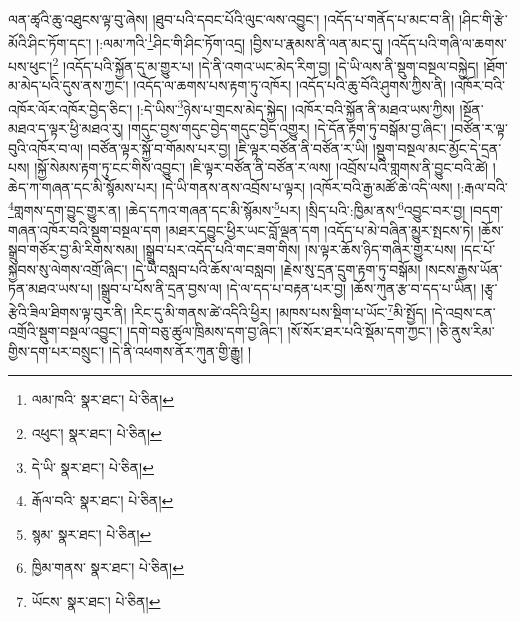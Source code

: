 ལན་ཚྭའི་ཆུ་འཐུངས་ལྟ་བུ་ཞེས། །ཐུབ་པའི་དབང་པོའི་ལུང་ལས་འབྱུང་། །འདོད་པ་གནོད་པ་མང་བ་ནི། །ཤིང་གི་རྩེ་མོའི་ཤིང་ཏོག་དང་། །:ལམ་ཀའི་\footnote{ལམ་ཁའི་  སྣར་ཐང་།  པེ་ཅིན། }ཤིང་གི་ཤིང་ཏོག་འདྲ། །བྱིས་པ་རྣམས་ནི་ལན་མང་དུ། །འདོད་པའི་གཞི་ལ་ཆགས་པས་ཕུང་།\footnote{འཕུང་།  སྣར་ཐང་།  པེ་ཅིན། } །འདོད་པའི་སྐྱོན་དུ་མ་གྱུར་པ། །དེ་ནི་འགའ་ཡང་མེད་རིག་བྱ། །དེ་ཡི་ལས་ནི་སྡུག་བསྔལ་བསྐྱེད། །ཐོག་མ་མེད་པའི་དུས་ནས་ཀྱང་། །འདོད་ལ་ཆགས་པས་རྟག་ཏུ་འཁོར། །འདོད་པའི་ཆུ་བོའི་ཤུགས་ཀྱིས་ནི། །འཁོར་བའི་འཁོར་ལོར་འཁོར་བྱེད་ཅིང་། །:དེ་ཡིས་\footnote{དེ་ཡི་  སྣར་ཐང་།  པེ་ཅིན། }ཉེས་པ་གྲངས་མེད་སྐྱེད། །འཁོར་བའི་སྐྱོན་ནི་མཐའ་ཡས་ཀྱིས། །སྔོན་མཐའ་ད་ལྟར་ཕྱི་མཐའ་རུ། །གདུང་བྱས་གདུང་བྱེད་གདུང་བྱེད་འགྱུར། །དེ་དོན་རྟག་ཏུ་བསྒོམ་བྱ་ཞིང་། །བཙོན་ར་ལྟ་བུའི་འཁོར་བ་ལ། །བཙོན་ལྟར་སྐྱོ་བ་གོམས་པར་བྱ། །ཇི་ལྟར་བཙོན་ནི་བཙོན་ར་ཡི། །སྡུག་བསྔལ་མང་མྱོང་དེ་དྲན་པས། །སྐྱོ་སེམས་རྟག་ཏུ་ངང་གིས་འབྱུང་། །ཇི་ལྟར་བཙོན་ནི་བཙོན་ར་ལས། །འབྲོས་པའི་གླགས་ནི་བྱུང་བའི་ཚེ། །ཆེད་ཀ་གཞན་དང་མི་སྙོམས་པར། །དེ་ཡི་གནས་ནས་འབྲོས་པ་ལྟར། །འཁོར་བའི་རྒྱ་མཚོ་ཆེ་འདི་ལས། །:རྒལ་བའི་\footnote{རྒོལ་བའི་  སྣར་ཐང་།  པེ་ཅིན། }གླགས་དག་བྱུང་གྱུར་ན། །ཆེད་དཀའ་གཞན་དང་མི་སྙོམས་\footnote{སྙམ་  སྣར་ཐང་།  པེ་ཅིན། }པར། །སྲིད་པའི་:ཁྱིམ་ནས་\footnote{ཁྱིམ་གནས་  སྣར་ཐང་།  པེ་ཅིན། }འབྱུང་བར་བྱ། །བདག་གཞན་འཁོར་བའི་སྡུག་བསྔལ་དག །མཐར་དབྱུང་ཕྱིར་ཡང་བློ་ལྡན་དག །འདོད་པ་མེ་བཞིན་མྱུར་སྤངས་ཏེ། །ཆོས་སྒྲུབ་གཙོར་བྱ་མི་རིགས་སམ། །སྒྲུབ་པར་འདོད་པའི་གང་ཟག་གིས། །ས་ལྟར་ཆོས་ཉིད་གཞིར་གྱུར་པས། །དང་པོ་སྐྱབས་སུ་ལེགས་འགྲོ་ཞིང་། །དེ་ཡི་བསླབ་པའི་ཆོས་ལ་བསླབ། །རྗེས་སུ་དྲན་དྲུག་རྟག་ཏུ་བསྒོམ། །སངས་རྒྱས་ཡོན་ཏན་མཐའ་ཡས་པ། །སྒྲུབ་པ་པོས་ནི་དྲན་བྱས་ལ། །དེ་ལ་དད་པ་བརྟན་པར་བྱ། །ཆོས་ཀུན་རྩ་བ་དད་པ་ཡིན། །རྩྭ་རྩེའི་ཟིལ་ཐིགས་ལྟ་བུར་ནི། །རིང་དུ་མི་གནས་ཚེ་འདིའི་ཕྱིར། །མཁས་པས་སྡིག་པ་ཡོང་\footnote{ཡོངས་  སྣར་ཐང་།  པེ་ཅིན། }མི་སྤྱོད། །དེ་འབྲས་ངན་འགྲོའི་སྡུག་བསྔལ་འབྱུང་། །དགེ་བཅུ་ཚུལ་ཁྲིམས་དག་བྱ་ཞིང་། །སོ་སོར་ཐར་པའི་སྡོམ་དག་ཀྱང་། །ཅི་ནུས་རིམ་གྱིས་དག་པར་བསྲུང་། །དེ་ནི་འཕགས་ནོར་ཀུན་གྱི་རྒྱུ། །
